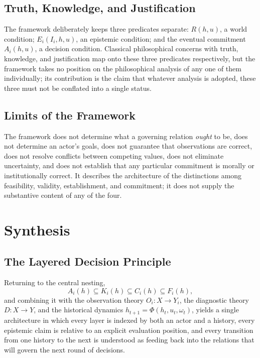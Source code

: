 \documentclass[11pt]{report}
\theoremstyle{definition}
\theoremstyle{plain}
\begin{document}
\chapter{Truth, Knowledge, and Justification}

The framework deliberately keeps three predicates separate: $R(h,u)$, a world condition; $E_i(I_i,h,u)$, an epistemic condition; and the eventual commitment $A_i(h,u)$, a decision condition. Classical philosophical concerns with truth, knowledge, and justification map onto these three predicates respectively, but the framework takes no position on the philosophical analysis of any one of them individually; its contribution is the claim that whatever analysis is adopted, these three must not be conflated into a single status.

\chapter{Limits of the Framework}

The framework does not determine what a governing relation \emph{ought} to be, does not determine an actor's goals, does not guarantee that observations are correct, does not resolve conflicts between competing values, does not eliminate uncertainty, and does not establish that any particular commitment is morally or institutionally correct. It describes the architecture of the distinctions among feasibility, validity, establishment, and commitment; it does not supply the substantive content of any of the four.

\part{Synthesis}

\chapter{The Layered Decision Principle}

Returning to the central nesting,
\[
A_i(h) \subseteq K_i(h) \subseteq C_i(h) \subseteq F_i(h),
\]
and combining it with the observation theory $O_i: X \to Y_i$, the diagnostic theory $D: X \to Y$, and the historical dynamics $h_{t+1} = \Phi(h_t,u_t,\omega_t)$, yields a single architecture in which every layer is indexed by both an actor and a history, every epistemic claim is relative to an explicit evaluation position, and every transition from one history to the next is understood as feeding back into the relations that will govern the next round of decisions.
\end{document}
